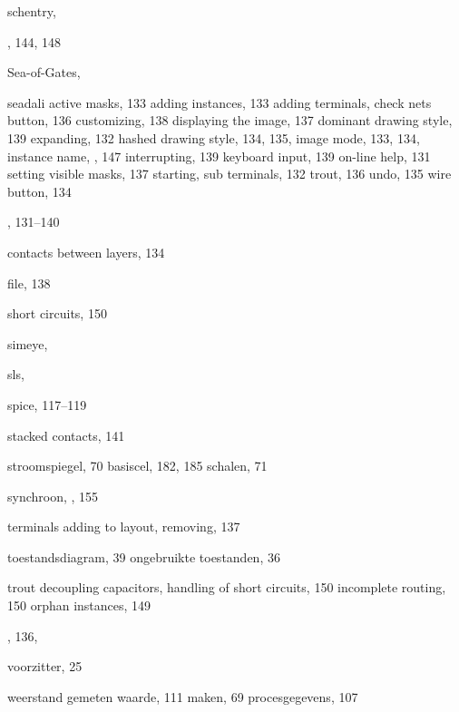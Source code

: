 \begin{theindex}
  \item schentry, 
  \item {}, 144, 148
  \item Sea-of-Gates, 
  \item seadali
    \subitem active masks, 133
    \subitem adding instances, 133
    \subitem adding terminals, 
    \subitem check nets button, 136
    \subitem customizing, 138
    \subitem displaying the image, 137
    \subitem dominant drawing style, 139
    \subitem expanding, 132
    \subitem hashed drawing style, 134, 135, 
    \subitem image mode, 133, 134, 
    \subitem instance name, , 147
    \subitem interrupting, 139
    \subitem keyboard input, 139
    \subitem on-line help, 131
    \subitem setting visible masks, 137
    \subitem starting, 
    \subitem sub terminals, 132
    \subitem trout, 136
    \subitem undo, 135
    \subitem wire button, 134
  \item {}, 131--140
  \item contacts between layers, 134
  \item {} file, 138
  \item short circuits, 150
  \item simeye, 
  \item sls, 
  \item spice, 117--119
  \item stacked contacts, 141
  \item stroomspiegel, 70
    \subitem basiscel, 182, 185
    \subitem schalen, 71
  \item synchroon, , 155

  \indexspace

  \item terminals
    \subitem adding to layout, 
    \subitem removing, 137
  \item toestandsdiagram, 39
    \subitem ongebruikte toestanden, 36
  \item trout
    \subitem decoupling capacitors, 
    \subitem handling of short circuits, 150
    \subitem incomplete routing, 150
    \subitem orphan instances, 149
  \item {}, 136, 

  \indexspace

  \item voorzitter, 25

  \indexspace

  \item weerstand
    \subitem gemeten waarde, 111
    \subitem maken, 69
    \subitem procesgegevens, 107

\end{theindex}
